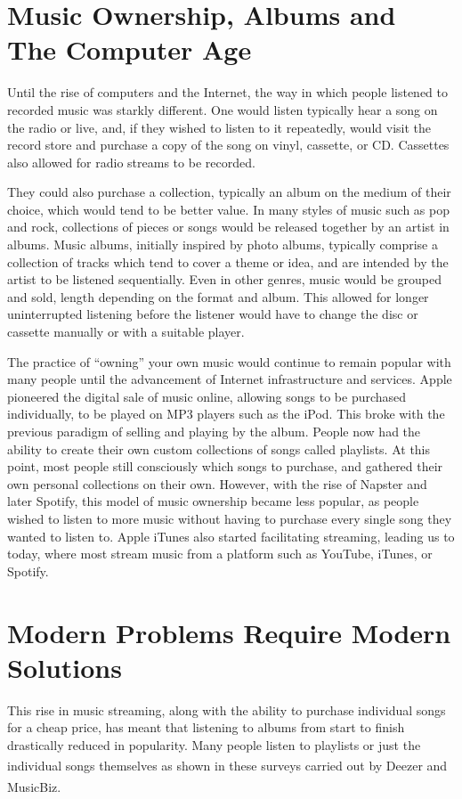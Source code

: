 \documentclass[a4paper, 12pt]{report}
\begin{document}
\section[Music Ownership, Albums and The Computer Age]{Music Ownership, Albums and \\ The Computer Age}
Until the rise of computers and the Internet, the way in which people listened to recorded music was starkly different. One would listen typically hear a song on the radio or live, and,
if they wished to listen to it repeatedly, would visit the record store and purchase a copy of the song on vinyl, cassette, or CD. 
Cassettes also allowed for radio streams to be recorded.

They could also purchase a collection, typically an album on the medium of their choice, which would tend to be better value.
In many styles of music such as pop and rock, collections of pieces or songs would be released together by an artist in albums.
Music albums, initially inspired by photo albums, typically comprise a collection of tracks which tend to cover a theme or idea, and are intended by the artist to be listened sequentially.
Even in other genres, music would be grouped and sold, length depending on the format and album. This allowed for longer uninterrupted listening before the
listener would have to change the disc or cassette manually or with a suitable player.

The practice of ``owning'' your own music would continue to remain popular with many people until the advancement of Internet infrastructure and services.
Apple pioneered the digital sale of music online, allowing songs to be purchased individually, to be played on MP3 players such as the iPod.
This broke with the previous paradigm of selling and playing by the album. People now had the ability to create their own custom collections of songs called playlists.
At this point, most people still consciously which songs to purchase, and gathered their own personal collections on their own.
However, with the rise of Napster and later Spotify, this model of music ownership became less popular, as people wished to listen to more music without having
to purchase every single song they wanted to listen to. Apple iTunes also started facilitating streaming, leading us to today, where most stream music 
from a platform such as YouTube, iTunes, or Spotify.

\section[Modern Problems Require Modern Solutions]{Modern Problems Require Modern \\ Solutions}
This rise in music streaming, along with the ability to purchase individual songs for a cheap price, has meant that listening to albums from start to finish
drastically reduced in popularity. Many people listen to playlists or just the individual songs themselves as shown in these surveys
carried out by Deezer\textsuperscript{\cite{deezer}} and MusicBiz\textsuperscript{\cite{musicbiz}}.
\end{document}
